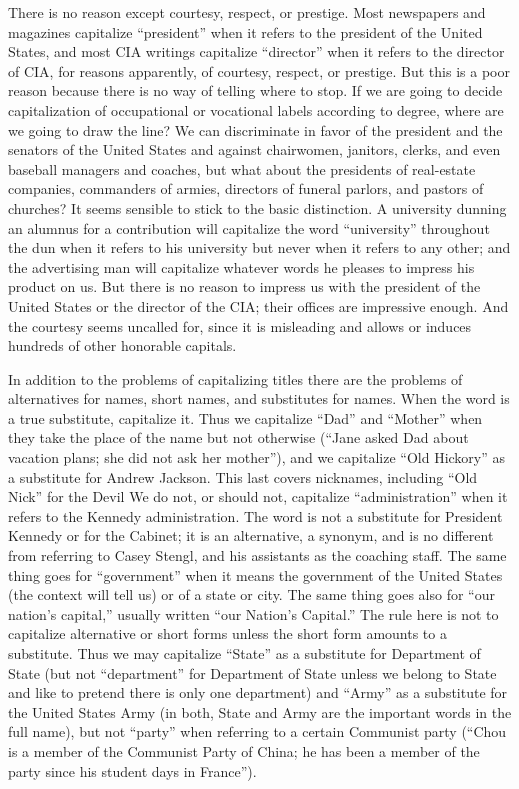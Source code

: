 \documentclass[
    oneside,
    11pt,
    draft
]{memoir}
\begin{document}
There is no reason except courtesy, respect, or prestige. Most newspapers and magazines capitalize \enquote{president} when it refers to the president of the United States, and most CIA writings capitalize \enquote{director} when it refers to the director of CIA, for reasons apparently, of courtesy, respect, or prestige. But this is a poor reason because there is no way of telling where to stop. If we are going to decide capitalization of occupational or vocational labels according to degree, where are we going to draw the line? We can discriminate in favor of the president and the senators of the United States and against chairwomen, janitors, clerks, and even baseball managers and coaches, but what about the presidents of real-estate companies, commanders of armies, directors of funeral parlors, and pastors of churches? It seems sensible to stick to the basic distinction. A university dunning an alumnus for a contribution will capitalize the word \enquote{university} throughout the dun when it refers to his university but never when it refers to any other; and the advertising man will capitalize whatever words he pleases to impress his product on us. But there is no reason to impress us with the president of the United States or the director of the CIA; their offices are impressive enough. And the courtesy seems uncalled for, since it is misleading and allows or induces hundreds of other honorable capitals.

In addition to the problems of capitalizing titles there are the problems of alternatives for names, short names, and substitutes for names. When the word is a true substitute, capitalize it. Thus we capitalize \enquote{Dad} and \enquote{Mother} when they take the place of the name but not otherwise (\enquote{Jane asked Dad about vacation plans; she did not ask her mother}), and we capitalize \enquote{Old Hickory} as a substitute for Andrew Jackson. This last covers nicknames, including \enquote{Old Nick} for the Devil We do not, or should not, capitalize \enquote{administration} when it refers to the Kennedy administration. The word is not a substitute for President Kennedy or for the Cabinet; it is an alternative, a synonym, and is no different from referring to Casey Stengl, and his assistants as the coaching staff. The same thing goes for \enquote{government} when it means the government of the United States (the context will tell us) or of a state or city. The same thing goes also for \enquote{our nation's capital,} usually written \enquote{our Nation's Capital.} The rule here is not to capitalize alternative or short forms unless the short form amounts to a substitute. Thus we may capitalize \enquote{State} as a substitute for Department of State (but not \enquote{department} for Department of State unless we belong to State and like to pretend there is only one department) and \enquote{Army} as a substitute for the United States Army (in both, State and Army are the important words in the full name), but not \enquote{party} when referring to a certain Communist party (\enquote{Chou is a member of the Communist Party of China; he has been a member of the party since his student days in France}).
\end{document}
